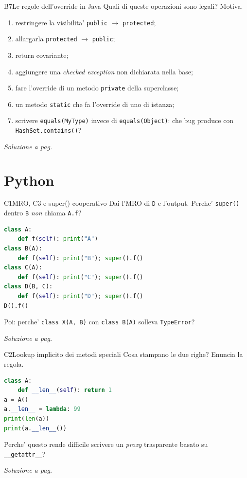 \documentclass{report}
\newcommand{\code}[1]{\texttt{\small #1}}
\newcommand{\dunder}[1]{\texttt{\small \_\_#1\_\_}}
\newcommand{\vaisol}[1]{%
    \par\vspace{4pt}\hfill{\footnotesize\itshape\color{gray}%
    Soluzione a pag.~\pageref{sol:#1}}%
}
\begin{document}
\begin{domanda}{B7}{Le regole dell'override in Java}
Quali di queste operazioni sono legali? Motiva.
\begin{enumerate}
    \item[(a)] restringere la visibilita' \code{public} $\rightarrow$ \code{protected};
    \item[(b)] allargarla \code{protected} $\rightarrow$ \code{public};
    \item[(c)] return covariante;
    \item[(d)] aggiungere una \emph{checked exception} non dichiarata nella base;
    \item[(e)] fare l'override di un metodo \code{private} della superclasse;
    \item[(f)] un metodo \code{static} che fa l'override di uno di istanza;
    \item[(g)] scrivere \code{equals(MyType)} invece di \code{equals(Object)}:
          che bug produce con \code{HashSet.contains()}?
\end{enumerate}
\vaisol{B7}
\end{domanda}

\chapter{Python}\label{ch:py}

\begin{domanda}{C1}{MRO, C3 e super() cooperativo}
Dai l'MRO di \code{D} e l'output. Perche' \code{super()} dentro \code{B}
\emph{non} chiama \code{A.f}?
\begin{lstlisting}[language=Python]
class A:
    def f(self): print("A")
class B(A):
    def f(self): print("B"); super().f()
class C(A):
    def f(self): print("C"); super().f()
class D(B, C):
    def f(self): print("D"); super().f()
D().f()
\end{lstlisting}
Poi: perche' \code{class X(A, B)} con \code{class B(A)} solleva
\code{TypeError}?
\vaisol{C1}
\end{domanda}

\begin{domanda}{C2}{Lookup implicito dei metodi speciali}
Cosa stampano le due righe? Enuncia la regola.
\begin{lstlisting}[language=Python]
class A:
    def __len__(self): return 1
a = A()
a.__len__ = lambda: 99
print(len(a))
print(a.__len__())
\end{lstlisting}
Perche' questo rende difficile scrivere un \emph{proxy} trasparente basato su
\dunder{getattr}?
\vaisol{C2}
\end{domanda}
\end{document}
